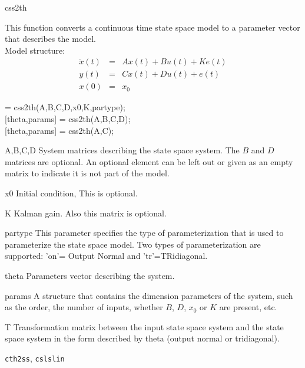 \documentclass{book}
\newcommand{\cslslin}{\texttt{cslslin}}
\newcommand{\cthtoss}{\texttt{cth2ss}}
\begin{document}
\begin{command}{css2th}
  \begin{purpose}
    This function converts a continuous time state space model to a
    parameter vector that describes the model.\\  Model structure:
   \begin{eqnarray*}
      \dot{x}(t) &=&  A x(t) + B u(t) +Ke(t)\\
      y(t) &=& C x(t) + Du(t) + e(t)\\
      x(0)&=&x_0
    \end{eqnarray*}
  \end{purpose}
  \begin{syntax}
     = css2th(A,B,C,D,x0,K,partype);\\[0pt]
    [theta,params] = css2th(A,B,C,D);\\[0pt]
    [theta,params] = css2th(A,C);
  \end{syntax}
  \begin{inputs}
  \item[A,B,C,D] System matrices describing the state space system.
    The $B$ and $D$ matrices are optional. An optional element can be left
    out or given as an empty matrix to indicate it is not part of the
    model.
  \item[x0] Initial condition, This is optional.
  \item[K] Kalman gain. Also this matrix is optional.
  \item[partype] This parameter specifies the type of parameterization 
    that is used to parameterize the state space model.
    Two types of parameterization are supported:
    'on'= Output Normal and 'tr'=TRidiagonal.
  \end{inputs}
  \begin{outputs}
  \item[theta] Parameters vector describing the system.
  \item[params] A structure that contains the dimension parameters of
    the system, such as the order, the number of inputs, whether $B$,
    $D$, $x_0$ or $K$ are present, etc.
  \item[T] Transformation matrix between the input state space system
    and the state space system in the form described by theta (output
    normal or tridiagonal).
  \end{outputs}
  \begin{seealso}
    \cthtoss, \cslslin
  \end{seealso}
\end{command}%
\end{document}
